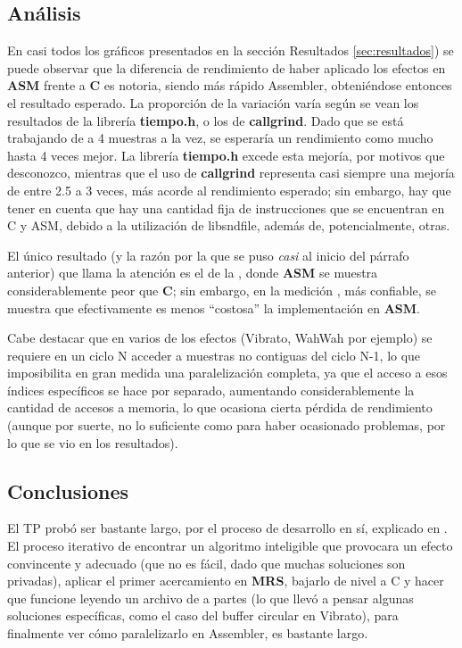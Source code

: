 \subsection{Análisis}
En casi todos los gráficos presentados en la sección Resultados \ref{sec:resultados}) se puede observar que la diferencia de rendimiento de haber aplicado los efectos en \textbf{ASM} frente a \textbf{C} es notoria, siendo más rápido Assembler, obteniéndose entonces el resultado esperado. La proporción de la variación varía según se vean los resultados de la librería \textbf{tiempo.h}, o los de \textbf{callgrind}. Dado que se está trabajando de a 4 muestras a la vez, se esperaría un rendimiento como mucho hasta 4 veces mejor. La librería \textbf{tiempo.h} excede esta mejoría, por motivos que desconozco, mientras que el uso de \textbf{callgrind} representa casi siempre una mejoría de entre 2.5 a 3 veces, más acorde al rendimiento esperado; sin embargo, hay que tener en cuenta que hay una cantidad fija de instrucciones que se encuentran en C y ASM, debido a la utilización de libsndfile, además de, potencialmente, otras.

El único resultado (y la razón por la que se puso \textit{casi} al inicio del párrafo anterior) que llama la atención es el de la , donde \textbf{ASM} se muestra considerablemente peor que \textbf{C}; sin embargo, en la medición , más confiable, se muestra que efectivamente es menos ``costosa'' la implementación en \textbf{ASM}.

Cabe destacar que en varios de los efectos (Vibrato, WahWah por ejemplo) se requiere en un ciclo N acceder a muestras no contiguas del ciclo N-1, lo que imposibilita en gran medida una paralelización completa, ya que el acceso a esos índices específicos se hace por separado, aumentando considerablemente la cantidad de accesos a memoria, lo que ocasiona cierta pérdida de rendimiento (aunque por suerte, no lo suficiente como para haber ocasionado problemas, por lo que se vio en los resultados).

\subsection{Conclusiones}
El TP probó ser bastante largo, por el proceso de desarrollo en sí, explicado en . El proceso iterativo de encontrar un algoritmo inteligible que provocara un efecto convincente y adecuado (que no es fácil, dado que muchas soluciones son privadas), aplicar el primer acercamiento en \textbf{MRS}, bajarlo de nivel a C y hacer que funcione leyendo un archivo de a partes (lo que llevó a pensar algunas soluciones específicas, como el caso del buffer circular en Vibrato), para finalmente ver cómo paralelizarlo en Assembler, es bastante largo.

